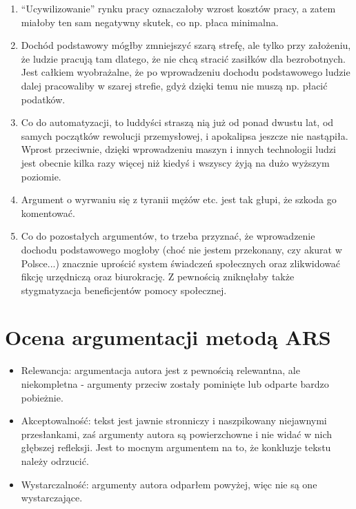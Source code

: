 \documentclass[11pt]{article}
\begin{document}
\begin{enumerate}
			\item ``Ucywilizowanie'' rynku pracy oznaczałoby wzrost kosztów pracy, a zatem miałoby ten sam negatywny skutek, co np. płaca minimalna.
			\item Dochód podstawowy mógłby zmniejszyć szarą strefę, ale tylko przy założeniu, że ludzie pracują tam dlatego, że nie chcą stracić zasiłków dla bezrobotnych. Jest całkiem wyobrażalne, że po wprowadzeniu dochodu podstawowego ludzie dalej pracowaliby w szarej strefie, gdyż dzięki temu nie muszą np. płacić podatków.
			\item Co do automatyzacji, to luddyści straszą nią już od ponad dwustu lat, od samych początków rewolucji przemysłowej, i apokalipsa jeszcze nie nastąpiła. Wprost przeciwnie, dzięki wprowadzeniu maszyn i innych technologii ludzi jest obecnie kilka razy więcej niż kiedyś i wszyscy żyją na dużo wyższym poziomie.
			\item Argument o wyrwaniu się z tyranii mężów etc. jest tak głupi, że szkoda go komentować.
			\item Co do pozostałych argumentów, to trzeba przyznać, że wprowadzenie dochodu podstawowego mogłoby (choć nie jestem przekonany, czy akurat w Polsce...) znacznie uprościć system świadczeń społecznych oraz zlikwidować fikcję urzędniczą oraz biurokrację. Z pewnością zniknęłaby także stygmatyzacja beneficjentów pomocy społecznej.
		\end{enumerate}	
	
	\section{Ocena argumentacji metodą ARS} 
		\begin{itemize}
			\item Relewancja: argumentacja autora jest z pewnością relewantna, ale niekompletna - argumenty przeciw zostały pominięte lub odparte bardzo pobieżnie.
			\item Akceptowalność: tekst jest jawnie stronniczy i naszpikowany niejawnymi przesłankami, zaś argumenty autora są powierzchowne i nie widać w nich głębszej refleksji. Jest to mocnym argumentem na to, że konkluzje tekstu należy odrzucić.
			\item Wystarczalność: argumenty autora odparłem powyżej, więc nie są one wystarczające.
		\end{itemize}
		
\end{document}
